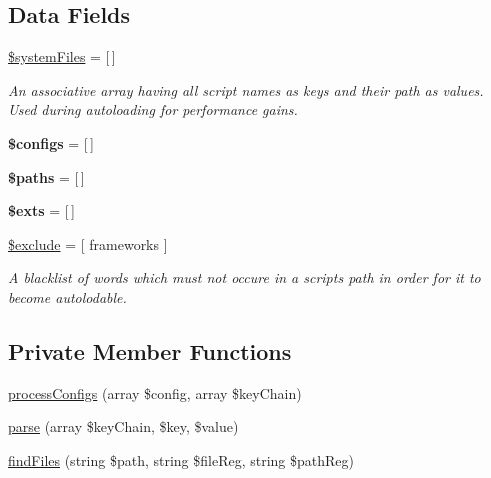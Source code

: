 \subsection*{Data Fields}
\begin{DoxyCompactItemize}
\item 
\mbox{\label{class_lora_1_1_configuration_a98263b0e190394325c61f471c0ba1e80}} 
\hyperlink{class_lora_1_1_configuration_a98263b0e190394325c61f471c0ba1e80}{\$system\+Files} = \mbox{[}$\,$\mbox{]}
\begin{DoxyCompactList}\small\item\em An associative array having all script names as keys and their path as values. Used during autoloading for performance gains. \end{DoxyCompactList}\item 
\mbox{\label{class_lora_1_1_configuration_a95691168d68a876ecc24c7dad14ef24e}} 
{\bfseries \$configs} = \mbox{[}$\,$\mbox{]}
\item 
\mbox{\label{class_lora_1_1_configuration_a20dd412769e0754189f5ce036e857a37}} 
{\bfseries \$paths} = \mbox{[}$\,$\mbox{]}
\item 
\mbox{\label{class_lora_1_1_configuration_afe662821d69ab461c44b3b7003bfcd19}} 
{\bfseries \$exts} = \mbox{[}$\,$\mbox{]}
\item 
\mbox{\label{class_lora_1_1_configuration_aa9e9e35cde2e009dabb6a066e3202c5c}} 
\hyperlink{class_lora_1_1_configuration_aa9e9e35cde2e009dabb6a066e3202c5c}{\$exclude} = \mbox{[} \textquotesingle{}frameworks\textquotesingle{} \mbox{]}
\begin{DoxyCompactList}\small\item\em A blacklist of words which must not occure in a scripts path in order for it to become autolodable. \end{DoxyCompactList}\end{DoxyCompactItemize}
\subsection*{Private Member Functions}
\begin{DoxyCompactItemize}
\item 
\hyperlink{class_lora_1_1_configuration_af93248667cb6f4c537483294dadcfbe0}{process\+Configs} (array \$config, array \$key\+Chain)
\item 
\hyperlink{class_lora_1_1_configuration_a425ab72d85b4f72a0d1d354970e5ac36}{parse} (array \$key\+Chain, \$key, \$value)
\item 
\hyperlink{class_lora_1_1_configuration_a1c83c8aa614a13481acfdd1917fa6fb1}{find\+Files} (string \$path, string \$file\+Reg, string \$path\+Reg)
\end{DoxyCompactItemize}
